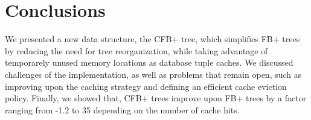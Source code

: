 \documentclass{article}
\begin{document}
\section{Conclusions}
We presented a new data structure, the CFB+ tree, which simplifies FB+ trees by reducing the need for tree reorganization,
while taking advantage of temporarely unused memory locations as database tuple caches.
We discussed challenges of the implementation, as well as problems that remain open,
such as improving upon the caching strategy and defining an efficient cache eviction policy.
Finally, we showed that, CFB+ trees improve upon FB+ trees by a factor ranging from -1.2 to 35 depending on the number of cache hits.

\small



\end{document}
